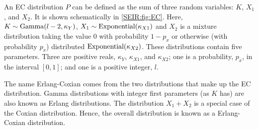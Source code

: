 \documentclass[thesis.tex]{subfiles}
\begin{document}

An EC distribution $P$ can be defined as the sum of three random variables: $K$, $X_1$, and $X_2$.
It is shown schematically in \cref{SEIR:fig:EC}.
Here, $K \sim \operatorname{Gamma}(l-2, \kappa_Y)$, $X_1 \sim \operatorname{Exponential}(\kappa_{X1})$ and $X_2$ is a mixture distribution taking the value 0 with probability $1-p_x$ or otherwise (\ie with probability $p_x$) distributed $\operatorname{Exponential}(\kappa_{X2})$.
These distributions contain five parameters.
Three are positive reals, $\kappa_Y$, $\kappa_{X1}$, and $\kappa_{X2}$; one is a probability, $p_x$, in the interval $[0, 1]$; and one is a positive integer, $l$.

The name Erlang-Coxian comes from the two distributions that make up the EC distribution.
Gamma distributions with integer first parameters (as $K$ has) are also known as Erlang distributions.
The distribution $X_1 + X_2$ is a special case of the Coxian distribution.
Hence, the overall distribution is known as a Erlang-Coxian distribution.
\end{document}
